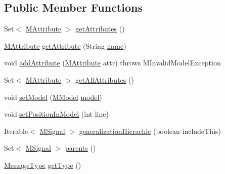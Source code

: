 \subsection*{Public Member Functions}
\begin{DoxyCompactItemize}
\item 
Set$<$ \hyperlink{classorg_1_1tzi_1_1use_1_1uml_1_1mm_1_1_m_attribute}{M\-Attribute} $>$ \hyperlink{interfaceorg_1_1tzi_1_1use_1_1uml_1_1mm_1_1commonbehavior_1_1communications_1_1_m_signal_aca4ab4e548f05a08609450716bd74034}{get\-Attributes} ()
\item 
\hyperlink{classorg_1_1tzi_1_1use_1_1uml_1_1mm_1_1_m_attribute}{M\-Attribute} \hyperlink{interfaceorg_1_1tzi_1_1use_1_1uml_1_1mm_1_1commonbehavior_1_1communications_1_1_m_signal_a3644434a1a8758297595a8aae69740cb}{get\-Attribute} (String \hyperlink{interfaceorg_1_1tzi_1_1use_1_1uml_1_1mm_1_1_m_named_element_af39159f41090d3cacd3dd088f8a6cc42}{name})
\item 
void \hyperlink{interfaceorg_1_1tzi_1_1use_1_1uml_1_1mm_1_1commonbehavior_1_1communications_1_1_m_signal_a2e7d2fc7d6627470647f5df7c96140c6}{add\-Attribute} (\hyperlink{classorg_1_1tzi_1_1use_1_1uml_1_1mm_1_1_m_attribute}{M\-Attribute} attr)  throws M\-Invalid\-Model\-Exception
\item 
Set$<$ \hyperlink{classorg_1_1tzi_1_1use_1_1uml_1_1mm_1_1_m_attribute}{M\-Attribute} $>$ \hyperlink{interfaceorg_1_1tzi_1_1use_1_1uml_1_1mm_1_1commonbehavior_1_1communications_1_1_m_signal_a9dd623eda49c2c0b7ba37d79c3cc751e}{get\-All\-Attributes} ()
\item 
void \hyperlink{interfaceorg_1_1tzi_1_1use_1_1uml_1_1mm_1_1commonbehavior_1_1communications_1_1_m_signal_aea32594eb393a105c24da5c3e781d83a}{set\-Model} (\hyperlink{classorg_1_1tzi_1_1use_1_1uml_1_1mm_1_1_m_model}{M\-Model} \hyperlink{interfaceorg_1_1tzi_1_1use_1_1uml_1_1mm_1_1_m_classifier_a34f38310d790d7b565c396c2dcec38b8}{model})
\item 
void \hyperlink{interfaceorg_1_1tzi_1_1use_1_1uml_1_1mm_1_1commonbehavior_1_1communications_1_1_m_signal_ac3a066bc5bd906f00ef5872f251c6f59}{set\-Position\-In\-Model} (int line)
\item 
Iterable$<$ \hyperlink{interfaceorg_1_1tzi_1_1use_1_1uml_1_1mm_1_1commonbehavior_1_1communications_1_1_m_signal}{M\-Signal} $>$ \hyperlink{interfaceorg_1_1tzi_1_1use_1_1uml_1_1mm_1_1commonbehavior_1_1communications_1_1_m_signal_aff63dc61be39796b3cef5b694604f467}{generalization\-Hierachie} (boolean include\-This)
\item 
Set$<$ \hyperlink{interfaceorg_1_1tzi_1_1use_1_1uml_1_1mm_1_1commonbehavior_1_1communications_1_1_m_signal}{M\-Signal} $>$ \hyperlink{interfaceorg_1_1tzi_1_1use_1_1uml_1_1mm_1_1commonbehavior_1_1communications_1_1_m_signal_a4a92bc0bb1e32ef4096341197de30bfb}{parents} ()
\item 
\hyperlink{classorg_1_1tzi_1_1use_1_1uml_1_1ocl_1_1type_1_1_message_type}{Message\-Type} \hyperlink{interfaceorg_1_1tzi_1_1use_1_1uml_1_1mm_1_1commonbehavior_1_1communications_1_1_m_signal_a38feb5c92da3b509c7daeae2d44ad468}{get\-Type} ()
\end{DoxyCompactItemize}


